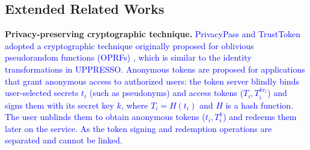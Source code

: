 \subsection{Extended Related Works}
\label{sec:related}

%
\noindent\textbf{Privacy-preserving cryptographic technique.}
\textcolor{blue}{PrivacyPass and TrustToken \cite{privacypass, trusttoken} adopted a cryptographic technique originally proposed for oblivious pseudorandom functions (OPRFs) \cite{oprf-proved}, which is similar to the identity transformations in UPPRESSO.
Anonymous tokens \cite{privacypass, trusttoken} are proposed for applications that grant anonymous access to authorized users: the token server blindly binds user-selected secrets $t_i$ (such as pseudonyms) and access tokens ($T_i, T_i^{k{r_i}}$) and signs them with its secret key $k$, where $T_i=H(t_i)$ and $H$ is a hash function.
The user unblinds them to obtain anonymous tokens ($t_i, T_i^k$) and redeems them later on the service.
As the token signing and redemption operations are separated and cannot be linked.}


